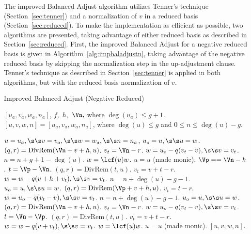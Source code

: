 The improved Balanced Adjust algorithm utilizes Tenner's technique
(Section~\ref{sec:tenner}) and a normalization of $v$ in a reduced basis
(Section~\ref{sec:reduced}). To make the implementation as efficient as
possible, two algorithms are presented, taking advantage of either reduced basis
as described in Section~\ref{sec:reduced}. First, the improved Balanced Adjust
for a negative reduced basis is given in Algorithm~\ref{alg:impbaladjustn},
taking advantage of the negative reduced basis by skipping the normalization
step in the up-adjustment clause. Tenner's technique as described in
Section~\ref{sec:tenner} is applied in both algorithms, but with the reduced
basis normalization of $v$.

\begin{algorithm}[htbp]
    \caption{Improved Balanced Adjust (Negative Reduced)}
    \label{alg:impbaladjustn}
    \begin{algorithmic}[1]
        \Require $[u_a,v_a, w_a, n_a]$, $f,$ $h,$ $\Vn,$ where $ \deg(u_a) \leq g+1$.
        \Ensure $[u,v,w,n] = [u_a,v_a, w_a, n_a]$, where $\deg(u) \leq g$ and 
                $0 \leq n \leq \deg(u) - g$.

        \State  $u = u_a, \s\s v = v_a, \s\s w = w_a, \s\s n = n_a$,
                \State $u_o = u, \s\s u = w$.
                \State $(q,r) = \mathrm{DivRem}(\Vn + v + h,u)$.
                \State $v_t = \Vn - r$.
                \State $w = u_o - q(v_t - v), \s\s v = v_t$.
                \State $n = n + g + 1 - \deg(u)$.
            \EndWhile
            \State $w = \lcf(u)w$.
            \State $u = u$ (made monic).
            \State $\Vp = =\Vn - h$.
            \State $t = \Vp - \Vn$.
            \State $(q,r) = \mathrm{DivRem}(t,u)$.
            \State $v_t = v + t - r$.
            \State $w = w - q(v + h + v_t), \s\s v = v_t$.
                \State $n = n + \deg(u) - g - 1$.
                \State $u_o = u, \s\s u = w$.
                \State $(q,r) = \mathrm{DivRem}(\Vp + v + h,u)$.
                \State $v_t = t - r$.
                \State $w = u_o - q(v_t - v), \s\s v = v_t$.
            \EndWhile
                \State $n = n + \deg(u) - g - 1$.
                \State $u_o = u, \s\s u = w$.
                \State $(q,r) = \mathrm{DivRem}(\Vn + v + h,u)$.
                \State $v_t = \Vn - r$.
                \State $w = u_o - q(v_t - v), \s\s v = v_t$.
            \Else
                \State $t = \Vn - \Vp$.
                \State $(q,r) = \mathrm{DivRem}(t,u)$.
                \State $v_t = v + t -r$.
                \State $w = w - q(v + v_t), \s\s v = v_t$.
            \EndIf
            \State $w = \lcf(u)w$.
            \State $u = u$ (made monic).
        \EndIf
        \State \Return $[u,v,w,n]$.
    \end{algorithmic}
\end{algorithm}

